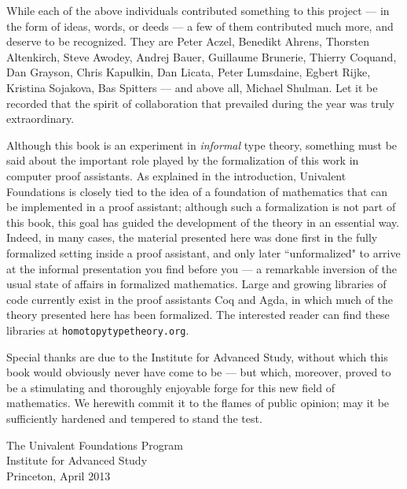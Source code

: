 \noindent While each of the above individuals contributed something to this project --- in the form of ideas, words, or deeds --- a few of them contributed much more, and deserve to be recognized.  They are Peter Aczel, Benedikt Ahrens, Thorsten Altenkirch,  Steve Awodey, Andrej Bauer, Guillaume Brunerie, Thierry Coquand, Dan Grayson, Chris Kapulkin, Dan Licata, Peter Lumsdaine, Egbert Rijke, Kristina Sojakova, Bas Spitters --- and above all, Michael Shulman.  Let it be recorded that the spirit of collaboration that prevailed during the year was truly extraordinary. 


Although this book is an experiment in \emph{informal} type theory, something must be said about the important role played by the formalization of this work in computer proof assistants.  As explained in the introduction, Univalent Foundations is closely tied to the idea of a foundation of mathematics that can be implemented in a proof assistant; although such a formalization is not part of this book, this goal has guided the development of the theory in an essential way. Indeed, in many cases, the material presented here was done first in the fully formalized setting inside a proof assistant, and only later ``unformalized" to arrive at the informal presentation you find before you --- a remarkable inversion of the usual state of affairs in formalized mathematics.   Large and growing libraries of code currently exist in the proof assistants Coq and Agda, in which much of the theory presented here has been formalized.  The interested reader can find these libraries at {\tt homotopytypetheory.org}.

Special thanks are due to the Institute for Advanced Study, without which this book would obviously never have come to be --- but which, moreover, proved to be a stimulating and thoroughly enjoyable forge for this new field of mathematics.  We herewith commit it to the flames of public opinion; may it be sufficiently hardened and tempered to stand the test. 

\bigskip

\begin{flushright}
The Univalent Foundations Program\\
Institute for Advanced Study\\
Princeton, April 2013
\end{flushright}

